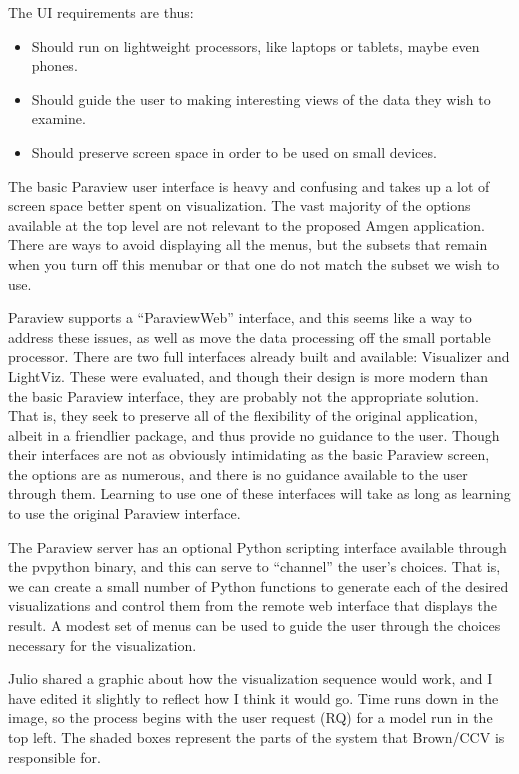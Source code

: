 \documentclass[11pt]{article}
\begin{document}
The UI requirements are thus:

\begin{itemize}

\item Should run on lightweight processors, like laptops or tablets,
  maybe even phones.

\item Should guide the user to making interesting views of the data
  they wish to examine.

\item Should preserve screen space in order to be used on small devices.

\end{itemize}

The basic Paraview user interface is heavy and confusing and takes up
a lot of screen space better spent on visualization. The vast majority
of the options available at the top level are not relevant to the
proposed Amgen application.  There are ways to avoid displaying all
the menus, but the subsets that remain when you turn off this menubar
or that one do not match the subset we wish to use.

Paraview supports a ``ParaviewWeb'' interface, and this seems like a
way to address these issues, as well as move the data processing off
the small portable processor.  There are two full interfaces already
built and available: Visualizer and LightViz.  These were evaluated,
and though their design is more modern than the basic Paraview
interface, they are probably not the appropriate solution.  That is,
they seek to preserve all of the flexibility of the original
application, albeit in a friendlier package, and thus provide no
guidance to the user.  Though their interfaces are not as obviously
intimidating as the basic Paraview screen, the options are as
numerous, and there is no guidance available to the user through them.
Learning to use one of these interfaces will take as long as learning
to use the original Paraview interface.

The Paraview server has an optional Python scripting interface
available through the pvpython binary, and this can
serve to ``channel'' the user's choices.  That is, we can create a
small number of Python functions to generate each of the desired
visualizations and control them from the remote web interface that
displays the result.  A modest set of menus can be used to guide the
user through the choices necessary for the visualization.

Julio shared a graphic about how the visualization sequence would
work, and I have edited it slightly to reflect how I think it would
go.  Time runs down in the image, so the process begins with the user
request (RQ) for a model run in the top left.  The shaded boxes
represent the parts of the system that Brown/CCV is responsible for.
\end{document}
